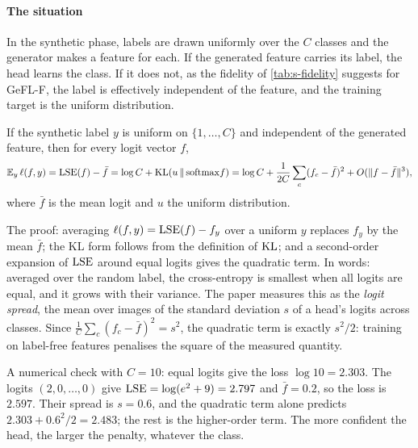 \paragraph{The situation} In the synthetic phase, labels are drawn uniformly over the $C$ classes and the generator
makes a feature for each. If the generated feature carries its label, the head learns the class. If it does not, as
the fidelity of \cref{tab:s-fidelity} suggests for GeFL-F, the label is effectively independent of the feature, and
the training target is the uniform distribution.

\begin{lemma*}
If the synthetic label $y$ is uniform on $\{1,\dots,C\}$ and independent of the generated feature, then for every logit
vector $f$,
\[
\mathbb{E}_y\,\ell(f,y)=\mathrm{LSE}(f)-\bar f=\log C+\mathrm{KL}(u\,\|\,\mathrm{softmax}f)=\log C+\frac1{2C}\sum_c(f_c-\bar f)^2+O(\|f-\bar f\|^3),
\]
where $\bar f$ is the mean logit and $u$ the uniform distribution.
\end{lemma*}

The proof: averaging $\ell(f,y)=\mathrm{LSE}(f)-f_y$ over a uniform $y$ replaces $f_y$ by the mean $\bar f$; the KL form
follows from the definition of $\mathrm{KL}$; and a second-order expansion of $\mathrm{LSE}$ around equal logits gives the quadratic
term. In words: averaged over the random label, the cross-entropy is smallest when all logits are equal, and it grows
with their variance. The paper measures this as the \emph{logit spread}, the mean over images of the standard
deviation $s$ of a head's logits across classes. Since $\frac1C\sum_c(f_c-\bar f)^2=s^2$, the quadratic term is
exactly $s^2/2$: training on label-free features penalises the square of the measured quantity.

A numerical check with $C=10$: equal logits give the loss $\log10=2.303$. The logits $(2,0,\dots,0)$ give
$\mathrm{LSE}=\log(e^2+9)=2.797$ and $\bar f=0.2$, so the loss is $2.597$. Their spread is $s=0.6$, and the quadratic term
alone predicts $2.303+0.6^2/2=2.483$; the rest is the higher-order term. The more confident the head, the larger the
penalty, whatever the class.

